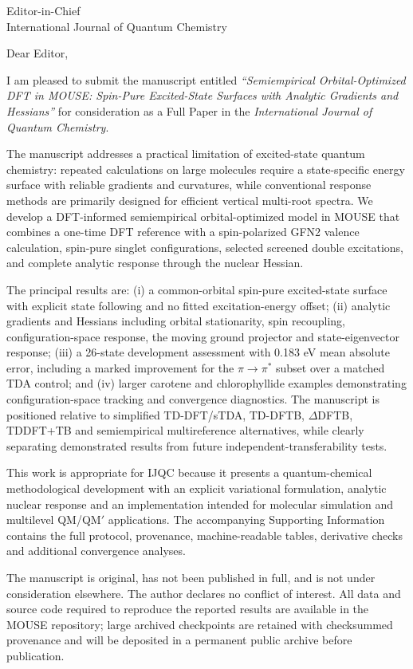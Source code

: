 \documentclass[11pt,a4paper]{letter}
\begin{document}
\sloppy
\begin{letter}{Editor-in-Chief\\International Journal of Quantum Chemistry}
\opening{Dear Editor,}

I am pleased to submit the manuscript entitled
\emph{“Semiempirical Orbital-Optimized DFT in MOUSE: Spin-Pure Excited-State
Surfaces with Analytic Gradients and Hessians”} for consideration as a Full
Paper in the \emph{International Journal of Quantum Chemistry}.

The manuscript addresses a practical limitation of excited-state quantum
chemistry: repeated calculations on large molecules require a state-specific
energy surface with reliable gradients and curvatures, while conventional
response methods are primarily designed for efficient vertical multi-root
spectra. We develop a DFT-informed semiempirical orbital-optimized model in
MOUSE that combines a one-time DFT reference with a spin-polarized GFN2
valence calculation, spin-pure singlet configurations, selected screened
double excitations, and complete analytic response through the nuclear
Hessian.

The principal results are: (i) a common-orbital spin-pure excited-state
surface with explicit state following and no fitted excitation-energy offset;
(ii) analytic gradients and Hessians including orbital stationarity, spin
recoupling, configuration-space response, the moving ground projector and
state-eigenvector response; (iii) a 26-state development assessment with
0.183 eV mean absolute error, including a marked improvement for the
$\pi\rightarrow\pi^*$ subset over a matched TDA control; and (iv) larger
carotene and chlorophyllide examples demonstrating configuration-space
tracking and convergence diagnostics. The manuscript is positioned relative
to simplified TD-DFT/sTDA, TD-DFTB, $\Delta$DFTB, TDDFT+TB and semiempirical
multireference alternatives, while clearly separating demonstrated results
from future independent-transferability tests.

This work is appropriate for IJQC because it presents a quantum-chemical
methodological development with an explicit variational formulation,
analytic nuclear response and an implementation intended for molecular
simulation and multilevel QM/QM$'$ applications. The accompanying Supporting
Information contains the full protocol, provenance, machine-readable tables,
derivative checks and additional convergence analyses.

The manuscript is original, has not been published in full, and is not under
consideration elsewhere. The author declares no conflict of interest. All
data and source code required to reproduce the reported results are available
in the MOUSE repository; large archived checkpoints are retained with
checksummed provenance and will be deposited in a permanent public archive
before publication.


\end{letter}
\end{document}
